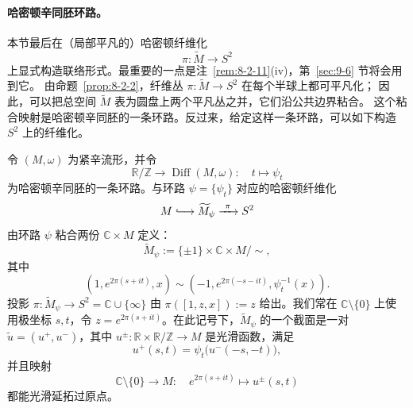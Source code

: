 \paragraph{哈密顿辛同胚环路。}
本节最后在（局部平凡的）哈密顿纤维化
\[
  \pi:\widetilde M\longrightarrow S^2
\]
上显式构造联络形式。最重要的一点是注~\ref{rem:8-2-11}(iv)，第~\ref{sec:9-6} 节将会用到它。
由命题~\ref{prop:8-2-2}，纤维丛 $\pi:\widetilde M\to S^2$ 在每个半球上都可平凡化；
因此，可以把总空间 $\widetilde M$ 表为圆盘上两个平凡丛之并，它们沿公共边界粘合。
这个粘合映射是哈密顿辛同胚的一条环路。反过来，给定这样一条环路，可以如下构造
$S^2$ 上的纤维化。

令 $(M,\omega)$ 为紧辛流形，并令
\[
  \mathbb R/\mathbb Z\longrightarrow\operatorname{Diff}(M,\omega):
  \quad t\longmapsto\psi_t
\]
为哈密顿辛同胚的一条环路。与环路 $\psi=\{\psi_t\}$ 对应的哈密顿纤维化
\[
  M\lhook\joinrel\longrightarrow\widetilde M_\psi
  \xrightarrow{\ \pi\ }S^2
\]
由环路 $\psi$ 粘合两份 $\mathbb C\times M$ 定义：
\begin{equation}\label{eq:8-2-6}
  \widetilde M_\psi:=\{\pm1\}\times\mathbb C\times M/\sim,
\end{equation}
其中
\[
  (1,e^{2\pi(s+it)},x)
  \sim(-1,e^{2\pi(-s-it)},\psi_t^{-1}(x)).
\]
投影 $\pi:\widetilde M_\psi\to S^2=\mathbb C\cup\{\infty\}$ 由
$\pi([1,z,x]):=z$ 给出。我们常在 $\mathbb C\setminus\{0\}$ 上使用极坐标 $s,t$，令
$z=e^{2\pi(s+it)}$。在此记号下，$\widetilde M_\psi$ 的一个截面是一对
$\widetilde u=(u^+,u^-)$，其中
$u^\pm:\mathbb R\times\mathbb R/\mathbb Z\to M$ 是光滑函数，满足
\[
  u^+(s,t)=\psi_t\bigl(u^-(-s,-t)\bigr),
\]
并且映射
\[
  \mathbb C\setminus\{0\}\longrightarrow M:\quad
  e^{2\pi(s+it)}\longmapsto u^\pm(s,t)
\]
都能光滑延拓过原点。

